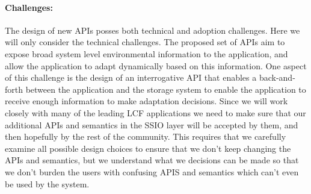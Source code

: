 %



\paragraph{Challenges:}
The design of new APIs posses both technical and adoption challenges. Here
we will only consider the technical challenges. The proposed set of APIs aim
to expose broad system level environmental information to the application,
and allow the application to adapt dynamically based on this information.
One aspect of this challenge is the design of an interrogative API that
enables a back-and-forth between the application and the storage system to
enable the application to receive enough information to make adaptation
decisions.  Since we will work closely with many of the leading LCF applications we need
to make sure that our additional APIs and semantics in the SSIO layer will be accepted by them, and then
hopefully by the rest of the community. This requires that we carefully examine all possible design choices to ensure
that we don't keep changing the APIs and semantics, but we understand what we decisions can be made so that
we don't burden the users with confusing APIS and semantics which can't even be used by the system.


